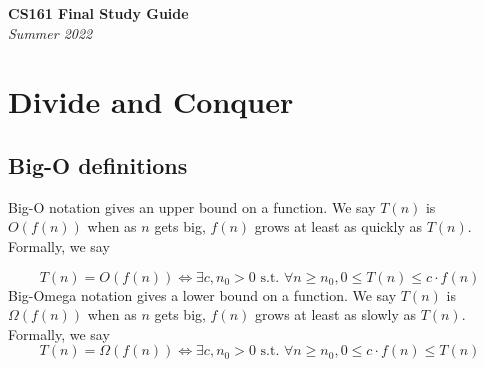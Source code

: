 \documentclass[12pt]{article}
\begin{document}
\begin{center}
      \Large\textbf{CS161 Final Study Guide}\\
      \large\textit{Summer 2022}
\end{center}
\tableofcontents

\section{Divide and Conquer}

\subsection*{Big-O definitions}
Big-O notation gives an upper bound on a function. We say $T(n)$ is $O(f(n))$ when as $n$ gets big, $f(n)$ grows at least as quickly as $T(n)$. Formally, we say

$$
T(n)=O(f(n)) \Longleftrightarrow \exists c, n_{0}>0 \text { s.t. } \forall n \geq n_{0}, 0 \leq T(n) \leq c \cdot f(n)
$$
Big-Omega notation gives a lower bound on a function. We say $T(n)$ is $\Omega(f(n))$ when as $n$ gets big, $f(n)$ grows at least as slowly as $T(n)$. Formally, we say
$$
T(n)=\Omega(f(n)) \Longleftrightarrow \exists c, n_{0}>0 \text { s.t. } \forall n \geq n_{0}, 0 \leq c \cdot f(n) \leq T(n)
$$
\end{document}
